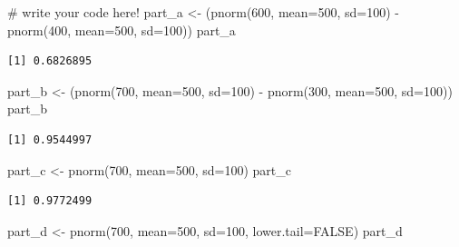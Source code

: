 \documentclass[
  letterpaper,
  DIV=11,
  numbers=noendperiod]{scrartcl}
\newenvironment{Shaded}{\begin{snugshade}}{\end{snugshade}}
\newcommand{\AttributeTok}[1]{\textcolor[rgb]{0.40,0.45,0.13}{#1}}
\newcommand{\CommentTok}[1]{\textcolor[rgb]{0.37,0.37,0.37}{#1}}
\newcommand{\ConstantTok}[1]{\textcolor[rgb]{0.56,0.35,0.01}{#1}}
\newcommand{\DecValTok}[1]{\textcolor[rgb]{0.68,0.00,0.00}{#1}}
\newcommand{\FunctionTok}[1]{\textcolor[rgb]{0.28,0.35,0.67}{#1}}
\newcommand{\NormalTok}[1]{\textcolor[rgb]{0.00,0.23,0.31}{#1}}
\newcommand{\OtherTok}[1]{\textcolor[rgb]{0.00,0.23,0.31}{#1}}
\newcommand{\SpecialCharTok}[1]{\textcolor[rgb]{0.37,0.37,0.37}{#1}}
\begin{document}
\begin{Shaded}
\begin{Highlighting}[]
\CommentTok{\# write your code here! }
\NormalTok{part\_a }\OtherTok{\textless{}{-}}\NormalTok{ (}\FunctionTok{pnorm}\NormalTok{(}\DecValTok{600}\NormalTok{, }\AttributeTok{mean=}\DecValTok{500}\NormalTok{, }\AttributeTok{sd=}\DecValTok{100}\NormalTok{) }\SpecialCharTok{{-}} \FunctionTok{pnorm}\NormalTok{(}\DecValTok{400}\NormalTok{, }\AttributeTok{mean=}\DecValTok{500}\NormalTok{, }\AttributeTok{sd=}\DecValTok{100}\NormalTok{))}
\NormalTok{part\_a}
\end{Highlighting}
\end{Shaded}

\begin{verbatim}
[1] 0.6826895
\end{verbatim}

\begin{Shaded}
\begin{Highlighting}[]
\NormalTok{part\_b }\OtherTok{\textless{}{-}}\NormalTok{ (}\FunctionTok{pnorm}\NormalTok{(}\DecValTok{700}\NormalTok{, }\AttributeTok{mean=}\DecValTok{500}\NormalTok{, }\AttributeTok{sd=}\DecValTok{100}\NormalTok{) }\SpecialCharTok{{-}} \FunctionTok{pnorm}\NormalTok{(}\DecValTok{300}\NormalTok{, }\AttributeTok{mean=}\DecValTok{500}\NormalTok{, }\AttributeTok{sd=}\DecValTok{100}\NormalTok{))}
\NormalTok{part\_b}
\end{Highlighting}
\end{Shaded}

\begin{verbatim}
[1] 0.9544997
\end{verbatim}

\begin{Shaded}
\begin{Highlighting}[]
\NormalTok{part\_c }\OtherTok{\textless{}{-}} \FunctionTok{pnorm}\NormalTok{(}\DecValTok{700}\NormalTok{, }\AttributeTok{mean=}\DecValTok{500}\NormalTok{, }\AttributeTok{sd=}\DecValTok{100}\NormalTok{)}
\NormalTok{part\_c}
\end{Highlighting}
\end{Shaded}

\begin{verbatim}
[1] 0.9772499
\end{verbatim}

\begin{Shaded}
\begin{Highlighting}[]
\NormalTok{part\_d }\OtherTok{\textless{}{-}} \FunctionTok{pnorm}\NormalTok{(}\DecValTok{700}\NormalTok{, }\AttributeTok{mean=}\DecValTok{500}\NormalTok{, }\AttributeTok{sd=}\DecValTok{100}\NormalTok{, }\AttributeTok{lower.tail=}\ConstantTok{FALSE}\NormalTok{)}
\NormalTok{part\_d}
\end{Highlighting}
\end{Shaded}
\end{document}
